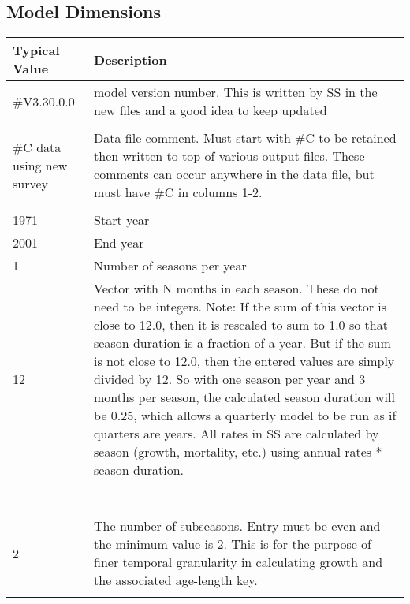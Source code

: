 \subsection{Model Dimensions}
\begin{center}
	\begin{tabular}{p{4cm} p{12cm}}
			\textbf{Typical Value} & \textbf{Description} \\
			\hline
			\#V3.30.0.0 & \multirow{1}{1cm}[-0.1cm]{\parbox{12cm}{model version number.  This is written by SS in the  new files and a good idea to keep updated}} \\
			&  \\
			\hline
			\#C data using new survey & \multirow{1}{1cm}[-0.1cm]{\parbox{12cm}{Data file comment. Must start with \#C to be retained then written to top of various output files.  These comments can occur anywhere in the data file, but must have \#C in columns 1-2.}} \\
			&  \\
			\hline
			1971 & Start year \\
			\hline
			2001 & End year \\
			\hline
			1 & Number of seasons per year \\
			\hline
			12 & \multirow{1}{1cm}[-0.1cm]{\parbox{12cm}{Vector with N months in each season.  These do not need to be integers.  Note:  If the sum of this vector is close to 12.0, then it is rescaled to sum to 1.0 so that season duration is a fraction of a year.  But if the sum is not close to 12.0, then the entered values are simply divided by 12.  So with one season per year and 3 months per season, the calculated season duration will be 0.25, which allows a quarterly model to be run as if quarters are years.  All rates in SS are  calculated by season (growth, mortality, etc.) using annual rates * season duration.}} \\
			& \\
			& \\
			& \\
			& \\
			& \\
			& \\
			& \\
			\hline
			2 & \multirow{1}{1cm}[-0.1cm]{\parbox{12cm}{The number of subseasons.  Entry must be even and the minimum value is 2. This is for the purpose of finer temporal granularity in calculating growth and the associated age-length key.}}\\
			& \\

\end{tabular}
\end{center}
